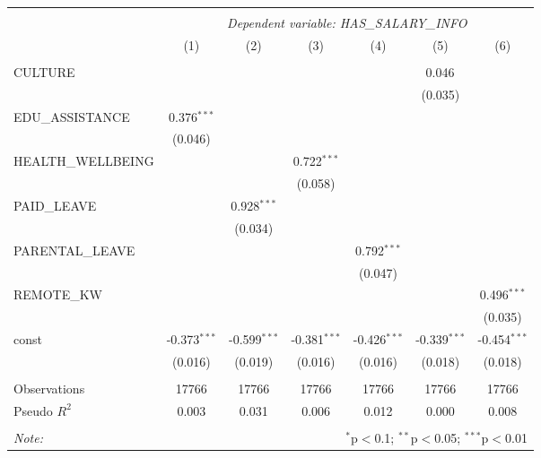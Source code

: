 \begin{table}[!htbp] \centering
\begin{tabular}{@{\extracolsep{5pt}}lcccccc}
\\[-1.8ex]\hline
\hline \\[-1.8ex]
& \multicolumn{6}{c}{\textit{Dependent variable: HAS_SALARY_INFO}} \
\cr \cline{2-7}
\\[-1.8ex] & (1) & (2) & (3) & (4) & (5) & (6) \\
\hline \\[-1.8ex]
 CULTURE & & & & & 0.046$^{}$ & \\
& & & & & (0.035) & \\
 EDU_ASSISTANCE & 0.376$^{***}$ & & & & & \\
& (0.046) & & & & & \\
 HEALTH_WELLBEING & & & 0.722$^{***}$ & & & \\
& & & (0.058) & & & \\
 PAID_LEAVE & & 0.928$^{***}$ & & & & \\
& & (0.034) & & & & \\
 PARENTAL_LEAVE & & & & 0.792$^{***}$ & & \\
& & & & (0.047) & & \\
 REMOTE_KW & & & & & & 0.496$^{***}$ \\
& & & & & & (0.035) \\
 const & -0.373$^{***}$ & -0.599$^{***}$ & -0.381$^{***}$ & -0.426$^{***}$ & -0.339$^{***}$ & -0.454$^{***}$ \\
& (0.016) & (0.019) & (0.016) & (0.016) & (0.018) & (0.018) \\
\hline \\[-1.8ex]
 Observations & 17766 & 17766 & 17766 & 17766 & 17766 & 17766 \\
 Pseudo $R^2$ & 0.003 & 0.031 & 0.006 & 0.012 & 0.000 & 0.008 \\
\hline
\hline \\[-1.8ex]
\textit{Note:} & \multicolumn{6}{r}{$^{*}$p$<$0.1; $^{**}$p$<$0.05; $^{***}$p$<$0.01} \\
\end{tabular}
\end{table}